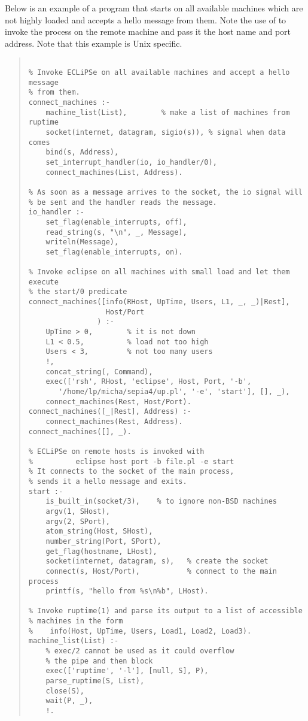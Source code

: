 Below is an example of a program that starts {\eclipse} on all
available machines which are not highly loaded and accepts
a hello message from them.
Note the use of  to invoke the process on the remote machine
and pass it the host name and port address. Note that this example is Unix
specific.
\begin{quote}
\begin{verbatim}

% Invoke ECLiPSe on all available machines and accept a hello message
% from them.
connect_machines :-
    machine_list(List),        % make a list of machines from ruptime
    socket(internet, datagram, sigio(s)), % signal when data comes
    bind(s, Address),
    set_interrupt_handler(io, io_handler/0),
    connect_machines(List, Address).

% As soon as a message arrives to the socket, the io signal will
% be sent and the handler reads the message.
io_handler :-
    set_flag(enable_interrupts, off),
    read_string(s, "\n", _, Message),
    writeln(Message),
    set_flag(enable_interrupts, on).

% Invoke eclipse on all machines with small load and let them execute
% the start/0 predicate
connect_machines([info(RHost, UpTime, Users, L1, _, _)|Rest],
                  Host/Port
                ) :-
    UpTime > 0,        % it is not down
    L1 < 0.5,          % load not too high
    Users < 3,         % not too many users
    !,
    concat_string(, Command),
    exec(['rsh', RHost, 'eclipse', Host, Port, '-b',
       '/home/lp/micha/sepia4/up.pl', '-e', 'start'], [], _),
    connect_machines(Rest, Host/Port).
connect_machines([_|Rest], Address) :-
    connect_machines(Rest, Address).
connect_machines([], _).

% ECLiPSe on remote hosts is invoked with
%          eclipse host port -b file.pl -e start
% It connects to the socket of the main process,
% sends it a hello message and exits.
start :-
    is_built_in(socket/3),    % to ignore non-BSD machines
    argv(1, SHost),
    argv(2, SPort),
    atom_string(Host, SHost),
    number_string(Port, SPort),
    get_flag(hostname, LHost),
    socket(internet, datagram, s),   % create the socket
    connect(s, Host/Port),           % connect to the main process
    printf(s, "hello from %s\n%b", LHost).

% Invoke ruptime(1) and parse its output to a list of accessible
% machines in the form
%    info(Host, UpTime, Users, Load1, Load2, Load3).
machine_list(List) :-
    % exec/2 cannot be used as it could overflow
    % the pipe and then block
    exec(['ruptime', '-l'], [null, S], P),
    parse_ruptime(S, List),
    close(S),
    wait(P, _),
    !.
\end{verbatim}
\end{quote}

